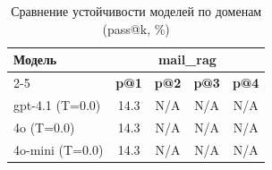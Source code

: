 \begin{table}[htbp]
\centering
\scriptsize
\setlength{\tabcolsep}{2pt}
\renewcommand{\arraystretch}{1.1}
\caption{Сравнение устойчивости моделей по доменам (pass@k, \%)}
\label{tab:aggregated}
\begin{tabular}{lcccc}
\toprule
\textbf{Модель} & \multicolumn{4}{c}{\textbf{mail\_rag}} \\
\cmidrule(lr){2-5}
 & \textbf{p@1} & \textbf{p@2} & \textbf{p@3} & \textbf{p@4} \\
\midrule
gpt-4.1 (T=0.0) & 14.3 & N/A & N/A & N/A \\
4o (T=0.0) & 14.3 & N/A & N/A & N/A \\
4o-mini (T=0.0) & 14.3 & N/A & N/A & N/A \\
\bottomrule
\end{tabular}
\end{table}